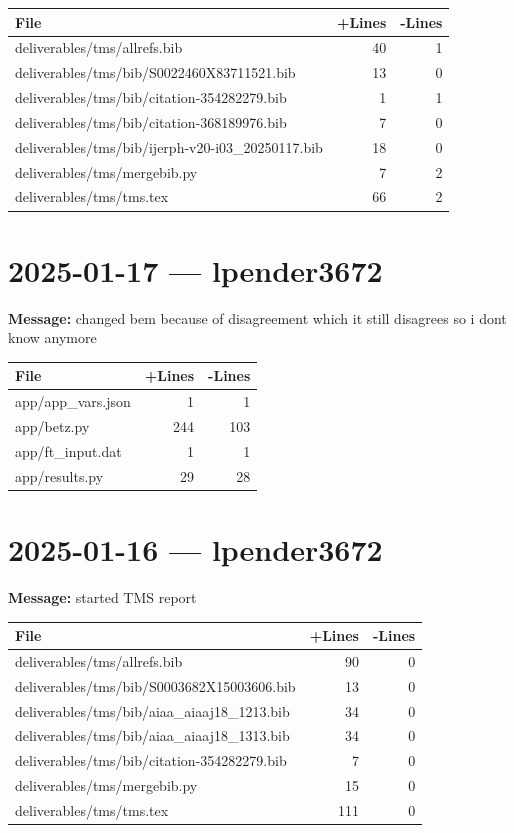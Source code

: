 \documentclass{article}
\begin{document}
\begin{longtable}{|p{10cm}|r|r|}
\hline \textbf{File} & \textbf{+Lines} & \textbf{-Lines} \\
\hline
deliverables/tms/allrefs.bib & 40 & 1 \\
\hline
deliverables/tms/bib/S0022460X83711521.bib & 13 & 0 \\
\hline
deliverables/tms/bib/citation-354282279.bib & 1 & 1 \\
\hline
deliverables/tms/bib/citation-368189976.bib & 7 & 0 \\
\hline
deliverables/tms/bib/ijerph-v20-i03\_20250117.bib & 18 & 0 \\
\hline
deliverables/tms/mergebib.py & 7 & 2 \\
\hline
deliverables/tms/tms.tex & 66 & 2 \\
\hline
\end{longtable}

\section*{2025-01-17 --- lpender3672}
\textbf{Message:} changed bem because of disagreement which it still disagrees so i dont know anymore

\begin{longtable}{|p{10cm}|r|r|}
\hline \textbf{File} & \textbf{+Lines} & \textbf{-Lines} \\
\hline
app/app\_vars.json & 1 & 1 \\
\hline
app/betz.py & 244 & 103 \\
\hline
app/ft\_input.dat & 1 & 1 \\
\hline
app/results.py & 29 & 28 \\
\hline
\end{longtable}

\section*{2025-01-16 --- lpender3672}
\textbf{Message:} started TMS report

\begin{longtable}{|p{10cm}|r|r|}
\hline \textbf{File} & \textbf{+Lines} & \textbf{-Lines} \\
\hline
deliverables/tms/allrefs.bib & 90 & 0 \\
\hline
deliverables/tms/bib/S0003682X15003606.bib & 13 & 0 \\
\hline
deliverables/tms/bib/aiaa\_aiaaj18\_1213.bib & 34 & 0 \\
\hline
deliverables/tms/bib/aiaa\_aiaaj18\_1313.bib & 34 & 0 \\
\hline
deliverables/tms/bib/citation-354282279.bib & 7 & 0 \\
\hline
deliverables/tms/mergebib.py & 15 & 0 \\
\hline
deliverables/tms/tms.tex & 111 & 0 \\
\hline
\end{longtable}
\end{document}
